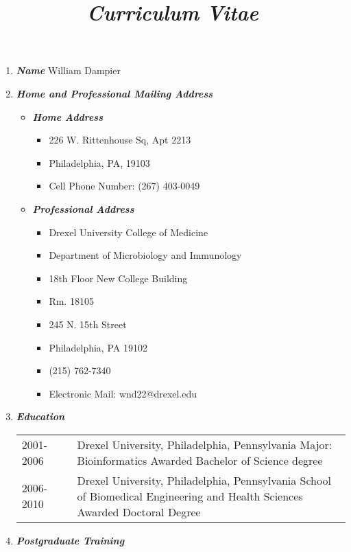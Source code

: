 \documentclass[a4paper,11pt]{article}
\title{\emph{Curriculum Vitae}}
\date{}
\begin{document}
\pagestyle{firstpage}

\begin{enumerate}
 \item {\LARGE \itshape \bfseries Name} \newline
 William Dampier
 \item {\LARGE \itshape \bfseries Home and Professional Mailing Address}
 \begin{itemize}
  \item[] {\Large \bfseries \itshape Home Address}
  \begin{itemize}
   \item[] 226 W. Rittenhouse Sq, Apt 2213
   \item[] Philadelphia, PA, 19103
   \item[] Cell Phone Number: (267) 403-0049
  \end{itemize}
  \item[] {\Large \bfseries \itshape Professional Address}
  \begin{itemize}
   \item[] Drexel University College of Medicine
   \item[] Department of Microbiology and Immunology
   \item[] 18th Floor New College Building
   \item[] Rm. 18105
   \item[] 245 N. 15th Street
   \item[] Philadelphia, PA 19102
   \item[] (215) 762-7340
   \item[] Electronic Mail:  wnd22@drexel.edu
  \end{itemize}
 \end{itemize}
 \item {\LARGE \itshape \bfseries Education}
 \begin{longtable}{p{}p{}p{}}
  2001-2006 & & Drexel University, Philadelphia, Pennsylvania \newline Major: Bioinformatics \newline Awarded Bachelor of Science degree \\
  2006-2010 & & Drexel University, Philadelphia, Pennsylvania \newline School of Biomedical Engineering and Health Sciences \newline Awarded Doctoral Degree \\
 \end{longtable}
 \item {\LARGE \itshape \bfseries Postgraduate Training}

\end{enumerate}
\end{document}
